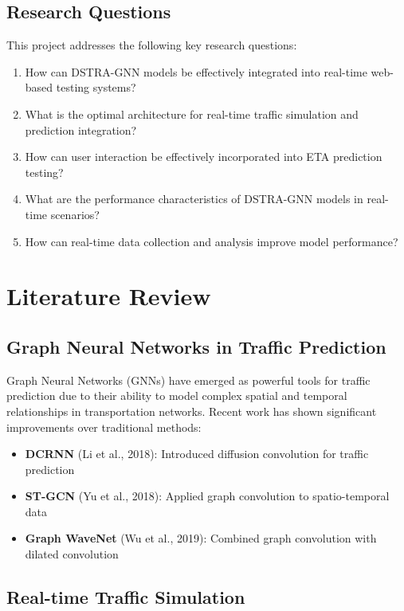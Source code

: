 \documentclass[12pt,a4paper]{article}
\begin{document}
\subsection{Research Questions}

This project addresses the following key research questions:

\begin{enumerate}
    \item How can DSTRA-GNN models be effectively integrated into real-time web-based testing systems?
    \item What is the optimal architecture for real-time traffic simulation and prediction integration?
    \item How can user interaction be effectively incorporated into ETA prediction testing?
    \item What are the performance characteristics of DSTRA-GNN models in real-time scenarios?
    \item How can real-time data collection and analysis improve model performance?
\end{enumerate}

\section{Literature Review}

\subsection{Graph Neural Networks in Traffic Prediction}

Graph Neural Networks (GNNs) have emerged as powerful tools for traffic prediction due to their ability to model complex spatial and temporal relationships in transportation networks. Recent work has shown significant improvements over traditional methods:

\begin{itemize}
    \item \textbf{DCRNN} (Li et al., 2018): Introduced diffusion convolution for traffic prediction
    \item \textbf{ST-GCN} (Yu et al., 2018): Applied graph convolution to spatio-temporal data
    \item \textbf{Graph WaveNet} (Wu et al., 2019): Combined graph convolution with dilated convolution
\end{itemize}

\subsection{Real-time Traffic Simulation}
\end{document}
